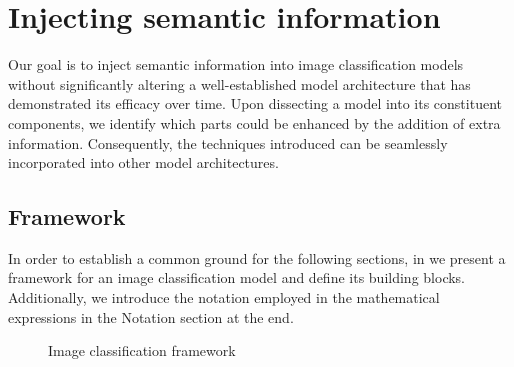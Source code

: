 \chapter{Injecting semantic information}
\label{ch:injecting-semantic-information}

Our goal is to inject semantic information into image classification models without significantly altering a well-established model architecture that has demonstrated its efficacy over time.
Upon dissecting a model into its constituent components, we identify which parts could be enhanced by the addition of extra information. Consequently, the techniques introduced can be seamlessly incorporated into other model architectures.

\section{Framework}
\label{sec:framework}

In order to establish a common ground for the following sections, in  we present a framework for an image classification model and define its building blocks.
Additionally, we introduce the notation employed in the mathematical expressions in the Notation section at the end.
\begin{figure}[htbp]
  \caption{Image classification framework}
  \label{fig:03/framework}
\end{figure}


